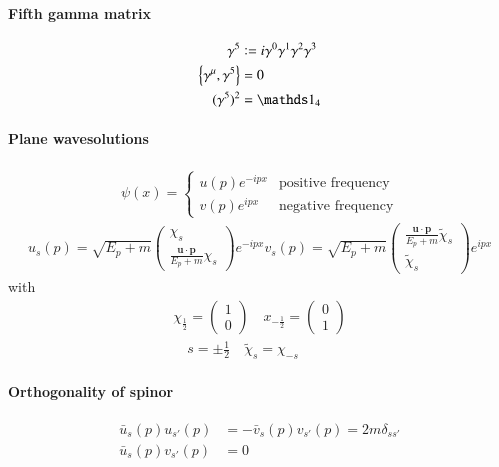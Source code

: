 \paragraph{Fifth gamma matrix}
\begin{align}
	\gamma^5 &\defeq i \gamma^0 \gamma^1 \gamma^2 \gamma^3 \\
	\left\{ \gamma^\mu, \gamma^5 \right\} &= 0 \\
	(\gamma^5)^2 &= \id_4
\end{align}
\paragraph{Plane wavesolutions}
\begin{align}
	\psi(x) = \begin{cases}
		u(p) e^{-ipx} & \text{positive frequency} \\
		v(p) e^{ipx} & \text{negative frequency}
	\end{cases}
\end{align}
\begin{align}
	u_s	(p) = \sqrt{E_p+m} \begin{pmatrix} \chi_s \\ \frac{\pmb{u}\cdot\pmb{p}}{E_p+m}\chi_s\end{pmatrix} e^{-ipx}
	v_s	(p) = \sqrt{E_p+m} \begin{pmatrix} \frac{\pmb{u}\cdot\pmb{p}}{E_p+m}\tilde{\chi}_s \\ \tilde{\chi}_s \end{pmatrix} e^{ipx}
\end{align}
with
\begin{align*}
	\chi_{\frac{1}{2}} = \begin{pmatrix} 1 \\ 0 \end{pmatrix} \quad x_{-\frac{1}{2}} = \begin{pmatrix} 0 \\ 1\end{pmatrix} \\
	\quad s=\pm\frac{1}{2} \quad \tilde{\chi}_s = \chi_{-s}
\end{align*}
\paragraph{Orthogonality of spinor}
\begin{align}
	\bar{u}_s(p) u_{s'}(p) &= -\bar{v}_s(p) v_{s'}(p) = 2m \delta_{ss'} \\
	\bar{u}_s(p) v_{s'}(p) &= 0
\end{align}
